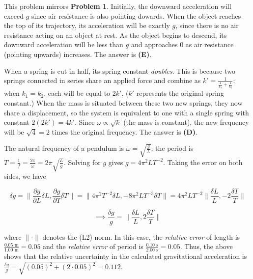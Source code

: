 \documentclass[12pt]{article}
\begin{document}

This problem mirrors \textbf{Problem 1}. Initially, the downward acceleration will exceed $g$ since air resistance is also pointing dowards. When the object reaches the top of its trajectory, its acceleration will be exactly $g$, since there is no air resistance acting on an object at rest. As the object begins to descend, its downward acceleration will be less than $g$ and approaches $0$ as air resistance (pointing upwards) increases. The answer is \textbf{(E)}.


\vspace{2 \baselineskip}



When a spring is cut in half, its spring constant \textit{doubles}. This is because two springs connected in series share an applied force and combine as $k' = \frac{1}{\frac{1}{k_1} + \frac{1}{k_2}}$; when $k_1 = k_2$, each will be equal to $2 k'$. ($k'$ represents the original spring constant.) When the mass is situated between these two new springs, they now share a displacement, so the system is equivalent to one with a single spring with constant $2 (2 k') = 4 k'$. Since $\omega \propto \sqrt{k}$ (the mass is constant), the new frequency will be $\sqrt{4} = 2$ times the original frequency. The answer is \textbf{(D)}.


\vspace{2 \baselineskip}



The natural frequency of a pendulum is $\omega = \sqrt{\frac{g}{L}}$; the period is $T = \frac{1}{f} = \frac{2 \pi}{\omega} = 2 \pi \sqrt{\frac{L}{g}}$. Solving for $g$ gives $g = 4 \pi^2 L T^{-2}$. Taking the error on both sides, we have

$$\delta g = \lVert \frac{\partial g}{\partial L} \delta L, \frac{\partial g}{\partial T} \delta T \rVert = \lVert 4 \pi^2 T^{-2} \delta L, -8 \pi^2 L T^{-3} \delta T \rVert = 4 \pi^2 L T^{-2} \lVert \frac{\delta L}{L}, -2 \frac{\delta T}{T} \rVert$$

$$\implies \frac{\delta g}{g} = \lVert \frac{\delta L}{L}, 2 \frac{\delta T}{T} \rVert$$

where $\lVert \cdot \rVert$ denotes the (L2) norm. In this case, the \textit{relative error} of length is $\frac{0.05 \text{ m}}{1.00 \text{ m}} = 0.05$ and the \textit{relative error} of period is $\frac{0.10 \text{ s}}{2.00 \text{ s}} = 0.05$. Thus, the above shows that the relative uncertainty in the calculated gravitational acceleration is $\frac{\delta g}{g} = \sqrt{(0.05)^2 + (2 \cdot 0.05)^2} = 0.112$.
\end{document}
